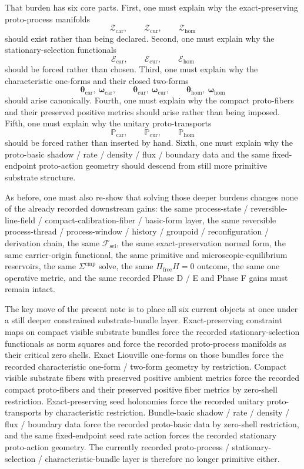 \documentclass[11pt]{article}
\newcommand{\StemFunctional}{\mathscr F_{\mathrm{sel}}}
\newcommand{\TensorProtoSpace}{\mathcal Z_{\mathrm{car}}}
\newcommand{\CurProtoSpace}{\mathcal Z_{\mathrm{cur}}}
\newcommand{\HomProtoSpace}{\mathcal Z_{\mathrm{hom}}}
\newcommand{\TensorSelection}{\mathscr E_{\mathrm{car}}}
\newcommand{\CurSelection}{\mathscr E_{\mathrm{cur}}}
\newcommand{\HomSelection}{\mathscr E_{\mathrm{hom}}}
\newcommand{\TensorCharForm}{\boldsymbol{\theta}_{\mathrm{car}}}
\newcommand{\CurCharForm}{\boldsymbol{\theta}_{\mathrm{cur}}}
\newcommand{\HomCharForm}{\boldsymbol{\theta}_{\mathrm{hom}}}
\newcommand{\TensorCharTwo}{\boldsymbol{\omega}_{\mathrm{car}}}
\newcommand{\CurCharTwo}{\boldsymbol{\omega}_{\mathrm{cur}}}
\newcommand{\HomCharTwo}{\boldsymbol{\omega}_{\mathrm{hom}}}
\newcommand{\TensorProtoTransport}{\mathbb P_{\mathrm{car}}}
\newcommand{\CurProtoTransport}{\mathbb P_{\mathrm{cur}}}
\newcommand{\HomProtoTransport}{\mathbb P_{\mathrm{hom}}}
\begin{document}
That burden has six core parts. First, one must explain why the exact-preserving proto-process manifolds
\[
\TensorProtoSpace,\qquad
\CurProtoSpace,\qquad
\HomProtoSpace
\]
should exist rather than being declared. Second, one must explain why the stationary-selection functionals
\[
\TensorSelection,\qquad
\CurSelection,\qquad
\HomSelection
\]
should be forced rather than chosen. Third, one must explain why the characteristic one-forms and their closed two-forms
\[
\TensorCharForm,\ \TensorCharTwo,\qquad
\CurCharForm,\ \CurCharTwo,\qquad
\HomCharForm,\ \HomCharTwo
\]
should arise canonically. Fourth, one must explain why the compact proto-fibers and their preserved positive metrics should arise rather than being imposed. Fifth, one must explain why the unitary proto-transports
\[
\TensorProtoTransport,\qquad
\CurProtoTransport,\qquad
\HomProtoTransport
\]
should be forced rather than inserted by hand. Sixth, one must explain why the proto-basic shadow / rate / density / flux / boundary data and the same fixed-endpoint proto-action geometry should descend from still more primitive substrate structure.

As before, one must also re-show that solving those deeper burdens changes none of the already recorded downstream gains: the same process-state / reversible-line-field / compact-calibration-fiber / basic-form layer, the same reversible process-thread / process-window / history / groupoid / reconfiguration / derivation chain, the same \(\StemFunctional\), the same exact-preservation normal form, the same carrier-origin functional, the same primitive and microscopic-equilibrium reservoirs, the same \(\Sigma^{\mathrm{cmp}}\) solve, the same \(\Pi_{\mathrm{free}}H=0\) outcome, the same one operative metric, and the same recorded Phase D / E and Phase F gains must remain intact.

The key move of the present note is to place all six current objects at once under a still deeper constrained substrate-bundle layer. Exact-preserving constraint maps on compact visible substrate bundles force the recorded stationary-selection functionals as norm squares and force the recorded proto-process manifolds as their critical zero shells. Exact Liouville one-forms on those bundles force the recorded characteristic one-form / two-form geometry by restriction. Compact visible substrate fibers with preserved positive ambient metrics force the recorded compact proto-fibers and their preserved positive fiber metrics by zero-shell restriction. Exact-preserving seed holonomies force the recorded unitary proto-transports by characteristic restriction. Bundle-basic shadow / rate / density / flux / boundary data force the recorded proto-basic data by zero-shell restriction, and the same fixed-endpoint seed rate action forces the recorded stationary proto-action geometry. The currently recorded proto-process / stationary-selection / characteristic-bundle layer is therefore no longer primitive either.
\end{document}
